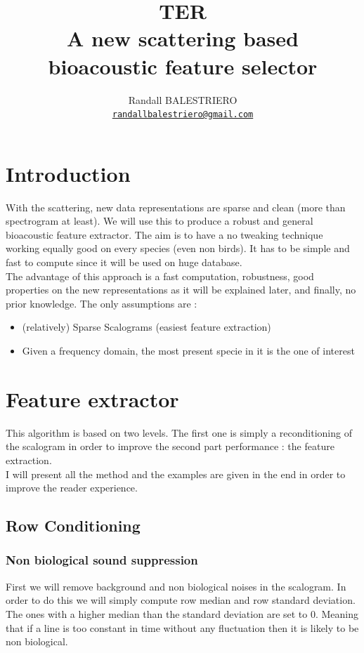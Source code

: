 \documentclass[a4paper]{article}
\title{TER\\A new scattering based \\bioacoustic feature selector}
\author{Randall BALESTRIERO\\
\texttt{\url{randallbalestriero@gmail.com}}}
\affil{Department of Mathematics, Pierre et Marie Curie University Paris 6}
\date{}
\begin{document}
\maketitle
\section{Introduction}
With the scattering, new data representations are sparse and clean (more than spectrogram at least). We will use this to produce a robust and general bioacoustic feature extractor. The aim is to have a no tweaking technique working equally good on every species (even non birds). It has to be simple and fast to compute since it will be used on huge database.
\\
The advantage of this approach is a fast computation, robustness, good properties on the new representations as it will be explained later, and finally, no prior knowledge. The only assumptions are :
\begin{itemize}

\item (relatively) Sparse Scalograms (easiest feature extraction)
\item Given a frequency domain, the most present specie in it is the one of interest

\end{itemize} 
\section{Feature extractor}
This algorithm is based on two levels. The first one is simply a reconditioning of the scalogram in order to improve the second part performance : the feature extraction.
\\
I will present all the method and the examples are given in the end in order to improve the reader experience.
\subsection{Row Conditioning}
\subsubsection{Non biological sound suppression}
First we will remove background and non biological noises in the scalogram. In order to do this we will simply compute row median and row standard deviation. The ones with a higher median than the standard deviation are set to $0$. Meaning that if a line is too constant in time without any fluctuation then it is likely to be non biological.
\end{document}
